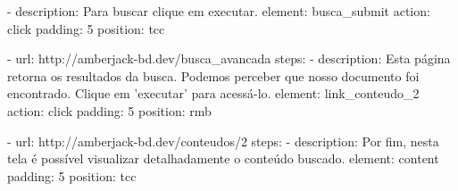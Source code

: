           - description: Para buscar clique em executar.
            element: busca_submit
            action: click
            padding: 5
            position: tcc

    - url: http://amberjack-bd.dev/busca_avancada
      steps:
          - description:
              Esta página retorna os resultados da busca.
              Podemos perceber que nosso documento foi encontrado.
              Clique em 'executar' para acessá-lo.
            element: link_conteudo_2
            action: click
            padding: 5
            position: rmb

    - url: http://amberjack-bd.dev/conteudos/2
      steps:
          - description:
              Por fim, nesta tela é possível visualizar
              detalhadamente o conteúdo buscado.
            element: content
            padding: 5
            position: tcc